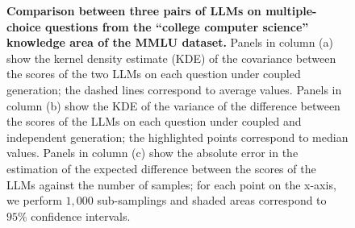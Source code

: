\begin{figure}[h]
\begin{tabular}{c c c}
\end{tabular}
    \caption{\textbf{Comparison between three pairs of LLMs on multiple-choice questions from the ``college computer science'' knowledge area of the MMLU dataset.}
    Panels in column (a) show the kernel density estimate (KDE) of the covariance between the scores of the two LLMs on each question under coupled generation; the dashed lines correspond to average values. Panels in column (b) show the KDE of the variance of the difference between the scores of the LLMs on each question under coupled and independent generation; the highlighted points correspond to median values. Panels in column (c) show the absolute error in the estimation of the expected difference between the scores of the LLMs against the number of samples; for each point on the x-axis, we perform $1{,}000$ sub-samplings and shaded areas correspond to $95\%$ confidence intervals.}
    \label{fig:mmlu-1B-vs-3B-models}
\end{figure}



